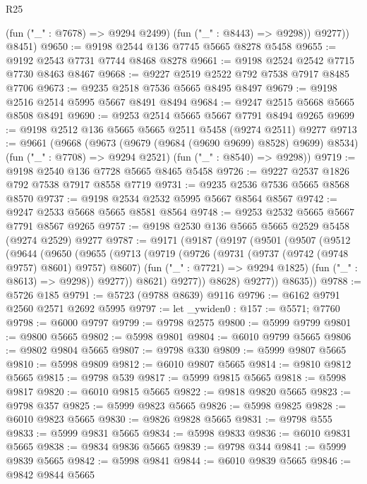 \begin{lexlean}{R25}
\begin{coremodule}
            (fun ("_" : @7678) => @9294 @2499)
            (fun ("_" : @8443) => @9298))
          @9277))
      @8451)
@9650 := @9198 @2544 @136 @7745 @5665 @8278 @5458
@9655 := @9192 @2543 @7731 @7744 @8468 @8278
@9661 := @9198 @2524 @2542 @7715 @7730 @8463 @8467
@9668 := @9227 @2519 @2522 @792 @7538 @7917 @8485 @7706
@9673 := @9235 @2518 @7536 @5665 @8495 @8497
@9679 := @9198 @2516 @2514 @5995 @5667 @8491 @8494
@9684 := @9247 @2515 @5668 @5665 @8508 @8491
@9690 := @9253 @2514 @5665 @5667 @7791 @8494 @9265
@9699 := @9198 @2512 @136 @5665 @5665 @2511 @5458 (@9274 @2511) @9277
@9713 := @9661
    (@9668
      (@9673 (@9679 (@9684 (@9690 @9699) @8528) @9699) @8534)
      (fun ("_" : @7708) => @9294 @2521)
      (fun ("_" : @8540) => @9298))
@9719 := @9198 @2540 @136 @7728 @5665 @8465 @5458
@9726 := @9227 @2537 @1826 @792 @7538 @7917 @8558 @7719
@9731 := @9235 @2536 @7536 @5665 @8568 @8570
@9737 := @9198 @2534 @2532 @5995 @5667 @8564 @8567
@9742 := @9247 @2533 @5668 @5665 @8581 @8564
@9748 := @9253 @2532 @5665 @5667 @7791 @8567 @9265
@9757 := @9198 @2530 @136 @5665 @5665 @2529 @5458 (@9274 @2529) @9277
@9787 := @9171
    (@9187
      (@9197
        (@9501
          (@9507
            (@9512
              (@9644
                (@9650
                  (@9655
                    (@9713
                      (@9719
                        (@9726
                          (@9731 (@9737 (@9742 (@9748 @9757) @8601) @9757) @8607)
                          (fun ("_" : @7721) => @9294 @1825)
                          (fun ("_" : @8613) => @9298))
                        @9277))
                    @8621)
                  @9277))
              @8628)
            @9277))
        @8635))
@9788 := @5726 @185
@9791 := @5723 (@9788 @8639) @9116
@9796 := @6162 @9791 @2560 @2571 @2692 @5995
@9797 := let _ywiden0 : @157 := @5571; @7760
@9798 := @6000 @9797
@9799 := @9798 @2575
@9800 := @5999 @9799
@9801 := @9800 @5665
@9802 := @5998 @9801
@9804 := @6010 @9799 @5665
@9806 := @9802 @9804 @5665
@9807 := @9798 @330
@9809 := @5999 @9807 @5665
@9810 := @5998 @9809
@9812 := @6010 @9807 @5665
@9814 := @9810 @9812 @5665
@9815 := @9798 @539
@9817 := @5999 @9815 @5665
@9818 := @5998 @9817
@9820 := @6010 @9815 @5665
@9822 := @9818 @9820 @5665
@9823 := @9798 @357
@9825 := @5999 @9823 @5665
@9826 := @5998 @9825
@9828 := @6010 @9823 @5665
@9830 := @9826 @9828 @5665
@9831 := @9798 @555
@9833 := @5999 @9831 @5665
@9834 := @5998 @9833
@9836 := @6010 @9831 @5665
@9838 := @9834 @9836 @5665
@9839 := @9798 @344
@9841 := @5999 @9839 @5665
@9842 := @5998 @9841
@9844 := @6010 @9839 @5665
@9846 := @9842 @9844 @5665

\end{coremodule}
\end{lexlean}
